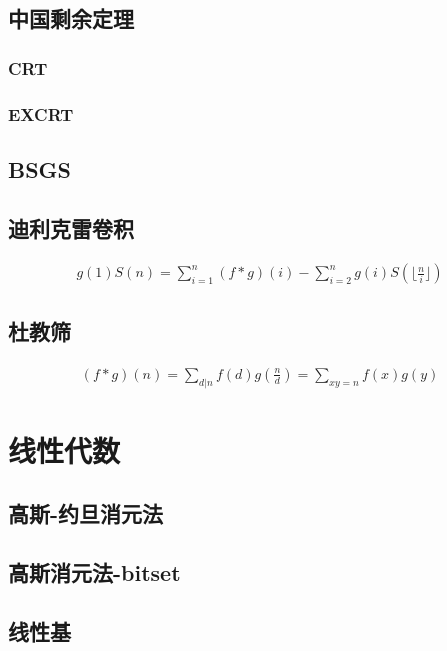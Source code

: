 \documentclass{article}
\begin{document}
\subsection{中国剩余定理}
\subsubsection{CRT}

\subsubsection{EXCRT}

\subsection{BSGS}
\subsection{迪利克雷卷积}

$$
\begin{aligned}
g(1)S(n)=\sum_{i=1}^n(f*g)(i)-\sum_{i=2}^ng(i)S(\lfloor\frac{n}{i}\rfloor)
\end{aligned}
$$

\subsection{杜教筛}

$$
\begin{aligned}
(f*g)(n)=\underset{d|n}{\sum} f(d)g(\frac{n}{d})=\underset{xy=n}{\sum} f(x)g(y)
\end{aligned}
$$

\section{线性代数}
\subsection{高斯-约旦消元法}

\subsection{高斯消元法-bitset}

\subsection{线性基}

\end{document}
